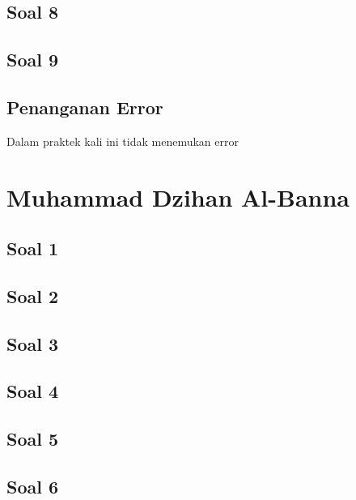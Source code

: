 \subsection{Soal 8}


\subsection{Soal 9}


\subsection{Penanganan Error}
Dalam praktek kali ini tidak menemukan error

\section{Muhammad Dzihan Al-Banna}
\subsection{Soal 1}
	
\subsection{Soal 2}
	
\subsection{Soal 3}
	
\subsection{Soal 4}
	
\subsection{Soal 5}
	
\subsection{Soal 6}
	

